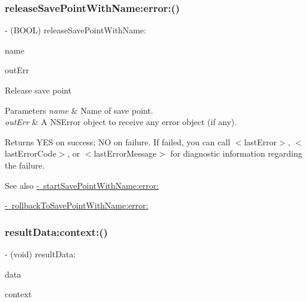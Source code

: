 \subsubsection{\texorpdfstring{release\+Save\+Point\+With\+Name\+:error\+:()}{releaseSavePointWithName:error:()}}
{\footnotesize\ttfamily -\/ (B\+O\+OL) release\+Save\+Point\+With\+Name\+: \begin{DoxyParamCaption}\item[{(N\+S\+String $\ast$)}]{name }\item[{error:(N\+S\+Error $\ast$\+\_\+\+Nullable $\ast$)}]{out\+Err }\end{DoxyParamCaption}}

Release save point


\begin{DoxyParams}{Parameters}
{\em name} & Name of save point.\\
\hline
{\em out\+Err} & A {\ttfamily N\+S\+Error} object to receive any error object (if any).\\
\hline
\end{DoxyParams}
\begin{DoxyReturn}{Returns}
{\ttfamily Y\+ES} on success; {\ttfamily NO} on failure. If failed, you can call {\ttfamily $<$last\+Error$>$}, {\ttfamily $<$last\+Error\+Code$>$}, or {\ttfamily $<$last\+Error\+Message$>$} for diagnostic information regarding the failure.
\end{DoxyReturn}
\begin{DoxySeeAlso}{See also}
\mbox{\hyperlink{interface_o_p_t_l_y_f_m_d_b_database_a394534a47e9f054edfc63021f2a1ebc3}{-\/ start\+Save\+Point\+With\+Name\+:error\+:}} 

\mbox{\hyperlink{interface_o_p_t_l_y_f_m_d_b_database_a8ae3bd5f48fed1f09b14328fc777dab5}{-\/ rollback\+To\+Save\+Point\+With\+Name\+:error\+:}} 
\end{DoxySeeAlso}
\mbox{\label{interface_o_p_t_l_y_f_m_d_b_database_abd92d5bcab93f267421e36f920c2a474}} 
\subsubsection{\texorpdfstring{result\+Data\+:context\+:()}{resultData:context:()}}
{\footnotesize\ttfamily -\/ (void) result\+Data\+: \begin{DoxyParamCaption}\item[{(N\+S\+Data $\ast$)}]{data }\item[{context:(void $\ast$)}]{context }\end{DoxyParamCaption}}

